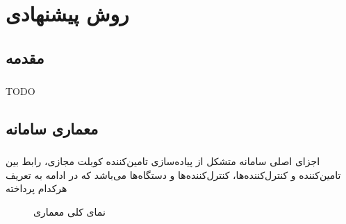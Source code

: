 
\chapter{روش پیشنهادی} \label{ch:method}
\thispagestyle{empty}

\section{مقدمه}
\paragraph{}{
    TODO
}

\section{معماری سامانه}
\paragraph{}{
    اجزای اصلی سامانه متشکل از پیاده‌سازی تامین‌کننده کوبلت مجازی، رابط بین تامین‌کننده و کنترل‌کننده‌ها، کنترل‌کننده‌ها و دستگاه‌ها می‌باشد که در ادامه به تعریف هرکدام پرداخته
    \begin{figure}[H]
        \caption{نمای کلی معماری}
        \label{fig:arch}
    \end{figure}
}
